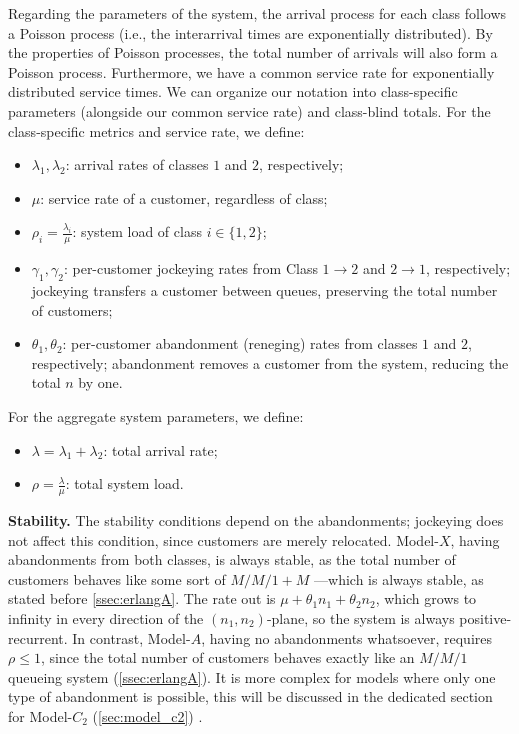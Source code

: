 Regarding the parameters of the system, the arrival process for each class follows a
Poisson process (i.e., the interarrival times are exponentially distributed). By the
properties of Poisson processes, the total number of arrivals will also form a
Poisson process. Furthermore, we have a common service rate for exponentially
distributed service times. We can organize our notation into class-specific
parameters (alongside our common service rate) and class-blind totals.
For the class-specific metrics and service rate, we define:
\begin{itemize}
    \item $\lambda_1, \lambda_2$: arrival rates of classes $1$ and $2$, respectively;
    \item $\mu$: service rate of a customer, regardless of class;
    \item $\rho_i = \frac{\lambda_i}{\mu}$: system load of class $i \in \{1,2\}$;
    \item $\gamma_1, \gamma_2$: per-customer jockeying rates from Class $1\to2$ and $2\to1$, respectively; jockeying transfers a customer between queues, preserving the total number of customers;
    \item $\theta_1, \theta_2$: per-customer abandonment (reneging) rates from classes $1$ and $2$, respectively; abandonment removes a customer from the system, reducing the total $n$ by one.
\end{itemize}
For the aggregate system parameters, we define:
\begin{itemize}
    \item $\lambda=\lambda_1+\lambda_2$: total arrival rate;
    \item $\rho=\frac{\lambda}{\mu}$: total system load.
\end{itemize}

\textbf{Stability.} The stability conditions depend on the abandonments; jockeying does not affect this condition, since customers are merely relocated. Model-$X$, having abandonments from both classes, is always stable, as the total number of customers behaves like some sort of $M/M/1+M$ —which is always stable, as stated before \ref{ssec:erlangA}. The rate out is $\mu+\theta_1 n_1+\theta_2 n_2$, which grows to infinity in every direction of the $(n_1,n_2)$-plane, so the system is always positive-recurrent. In contrast, Model-$A$, having no abandonments whatsoever, requires $\rho \leq 1$, since the total number of customers behaves exactly like an $M/M/1$ queueing system (\ref{ssec:erlangA}). It is more complex for models where only one type of abandonment is possible, this will be discussed in the dedicated section for Model-$C_2$ (\ref{sec:model_c2}) .


